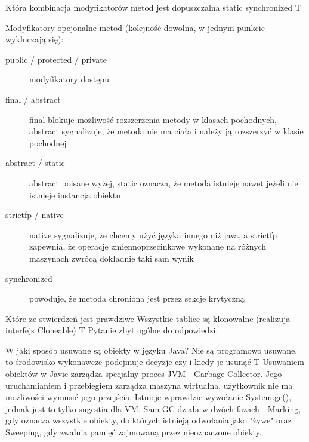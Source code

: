 \answer
{Która kombinacja modyfikatorów metod jest dopuszczalna}
{static synchronized}
{T}
{Modyfikatory opcjonalne metod (kolejność dowolna, w jednym punkcie wykluczają się): 
   \begin {description}
	 \item [public / protected / private] modyfikatory dostępu
     \item [final / abstract] final blokuje możliwość rozszerzenia metody w klasach pochodnych, abstract sygnalizuje, że metoda nie ma ciała i należy ją rozszerzyć w klasie pochodnej
     \item [abstract / static] abstract poisane wyżej, static oznacza, że metoda istnieje nawet jeżeli nie istnieje instancja obiektu
     \item [strictfp / native] native sygnalizuje, że chcemy użyć języka innego niż java, a strictfp zapewnia, że operacje zmiennoprzecinkowe wykonane na różnych maszynach zwrócą dokładnie taki sam wynik
     \item [synchronized] powoduje, że metoda chroniona jest przez sekcje krytyczną
   \end {description}}
{}

\answer
{Które ze stwierdzeń jest prawdziwe}
{Wszystkie tablice są klonowalne (realizuja interfejs Cloneable)}
{T}
{Pytanie zbyt ogólne do odpowiedzi.}
{}

\answer
{W jaki sposób usuwane są obiekty w języku Java?}
{Nie są programowo usuwane, to środowisko wykonawcze podejmuje decyzje czy i kiedy je usunąć}
{T}
{Usuwaniem obiektów w Javie zarządza specjalny proces JVM - Garbage Collector. Jego uruchamianiem i przebiegiem zarządza maszyna wirtualna, użytkownik nie ma możliwości wymusić jego przejścia. Istnieje wprawdzie wywołanie System.gc(), jednak jest to tylko sugestia dla VM. Sam GC działa w dwóch fazach - Marking, gdy oznacza wszystkie obiekty, do których istnieją odwołania jako "żywe" oraz Sweeping, gdy zwalnia pamięć zajmowaną przez nieoznaczone obiekty.}
{}

